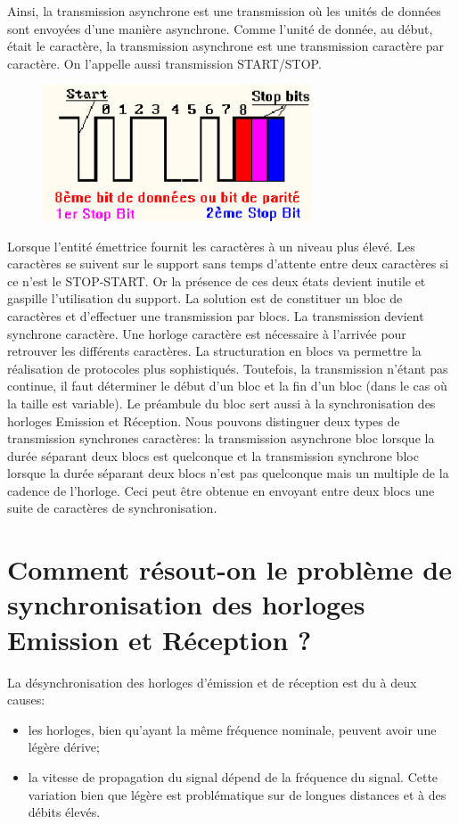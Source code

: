 Ainsi, la transmission asynchrone est une transmission où les unités de données sont envoyées
d'une manière asynchrone. Comme l'unité de donnée, au début, était le caractère, la
transmission asynchrone est une transmission caractère par caractère. On l'appelle aussi
transmission START/STOP.
\begin{figure}[H]
	\centering
	\includegraphics[width=8cm]{partie2/asynchrone.jpg}
\end{figure}
Lorsque l'entité émettrice fournit les caractères à un niveau plus élevé. Les caractères se
suivent sur le support sans temps d'attente entre deux caractères si ce n'est le STOP-START.
Or la présence de ces deux états devient inutile et gaspille l'utilisation du support. La
solution est de constituer un bloc de caractères et d'effectuer une transmission par blocs. La
transmission devient synchrone caractère. Une horloge caractère est nécessaire à l'arrivée
pour retrouver les différents caractères. La structuration en blocs va permettre la
réalisation de protocoles plus sophistiqués. Toutefois, la transmission n'étant pas continue,
il faut déterminer le début d'un bloc et la fin d'un bloc (dans le cas où la taille est
variable). Le préambule du bloc sert aussi à la synchronisation des horloges Emission et
Réception. Nous pouvons distinguer deux types de transmission synchrones caractères: la
transmission asynchrone bloc lorsque la durée séparant deux blocs est quelconque et la
transmission synchrone bloc lorsque la durée séparant deux blocs n'est pas quelconque mais un
multiple de la cadence de l'horloge. Ceci peut être obtenue en envoyant entre deux blocs une
suite de caractères de synchronisation.

\section{Comment résout-on le problème de synchronisation des horloges Emission et Réception ?}
La désynchronisation des horloges d'émission et de réception est du à deux causes:

\begin{itemize}
	\item les horloges, bien qu'ayant la même fréquence nominale, peuvent avoir une légère dérive;
	\item la vitesse de propagation du signal dépend de la fréquence du signal. Cette variation bien
que légère est problématique sur de longues distances et à des débits élevés.
\end{itemize}


